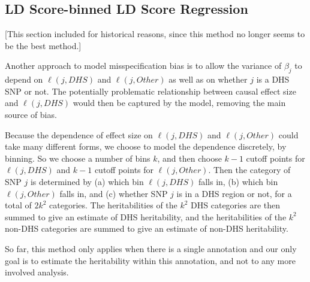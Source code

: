 \documentclass[11pt]{article}
\begin{document}

\subsection{LD Score-binned LD Score Regression}
[This section included for historical reasons, since this method no longer seems to be the best method.]


Another approach to model misspecification bias is to allow the variance of $\beta_j$ to depend on $\ell(j,DHS)$ and $\ell(j,Other)$ as well as on whether $j$ is a DHS SNP or not. The potentially problematic relationship between causal effect size and $\ell(j,DHS)$ would then be captured by the model, removing the main source of bias. 

Because the dependence of effect size on $\ell(j,DHS)$ and $\ell(j,Other)$ could take many different forms, we choose to model the dependence discretely, by binning. So we choose a number of bins $k$, and then choose $k-1$ cutoff points for $\ell(j,DHS)$ and $k-1$ cutoff points for $\ell(j,Other)$. Then the category of SNP $j$ is determined by (a) which bin $\ell(j,DHS)$ falls in, (b) which bin $\ell(j,Other)$ falls in, and (c) whether SNP $j$ is in a DHS region or not, for a total of $2k^2$ categories. The heritabilities of the $k^2$ DHS categories are then summed to give an estimate of DHS heritability, and the heritabilities of the $k^2$ non-DHS categories are summed to give an estimate of non-DHS heritability. 

So far, this method only applies when there is a single annotation and our only goal is to estimate the heritability within this annotation, and not to any more involved analysis.
\end{document}
